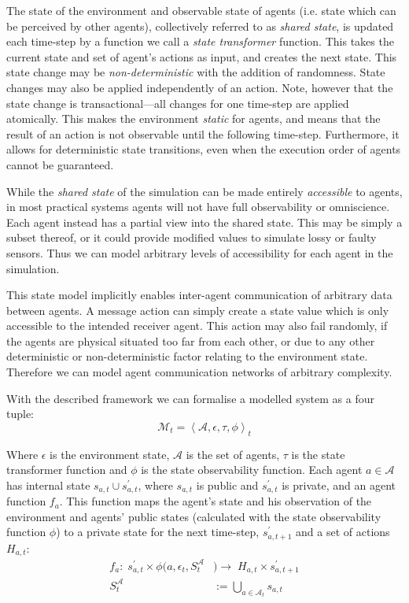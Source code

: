 The state of the environment and observable state of agents (i.e. state which
can be perceived by other agents), collectively referred to as \emph{shared
state}, is updated each time-step by a function we call a \emph{state
transformer} function. This takes the current state and set of agent's
actions as input, and creates the next state. This state change may be 
\emph{non-deterministic} with the addition of randomness. State changes may 
also be applied independently of an action. Note, however that the state change 
is transactional---all changes for one time-step are applied atomically. This
makes the environment \emph{static} for agents, and means that the result of
an action is not observable until the following time-step. Furthermore, it allows 
for deterministic state transitions, even when the execution order of agents 
cannot be guaranteed.

While the \emph{shared state} of the simulation can be made entirely
\emph{accessible} to agents, in most practical systems agents will not have
full observability or omniscience. Each agent instead has a partial view into
the shared state. This may be simply a subset thereof, or it could provide
modified values to simulate lossy or faulty sensors. Thus we can model
arbitrary levels of accessibility for each agent in the simulation.

This state model implicitly enables inter-agent communication of arbitrary
data between agents. A message action can simply create a state value which is
only accessible to the intended receiver agent. This action may also fail
randomly, if the agents are physical situated too far from each other, or due
to any other deterministic or non-deterministic factor relating to the environment
state. Therefore we can model agent communication networks of arbitrary
complexity.


With the described framework we can formalise a modelled system as a four tuple:
\begin{equation*}
\mathcal{M}_{t}=\left\langle \mathcal{A},\epsilon,\tau,\phi \right\rangle _{t}
\end{equation*}

Where $\epsilon$ is the environment state, $\mathcal{A}$ is the set of agents, $\tau$ is the state transformer function and $\phi$ is the state observability function. Each
agent $a\in\mathcal{A}$ has internal state $s_{a,t}\cup s_{a,t}^{\prime}$,
where $s_{a,t}$ is public and $s_{a,t}^{\prime}$ is private, and
an agent function $f_{a}$. This function maps the agent's state and his observation of the environment and agents' public states (calculated with the state observability function $\phi$) to a private
state for the next time-step, $s_{a,t+1}^{\prime}$ and a set of actions
$H{}_{a,t}$:
\begin{align*}
f_{a}:\; s_{a,t}^{\prime} \times \phi(a, \epsilon_{t}, S_{t}^{\mathcal{A}}&) \rightarrow\; H_{a,t}\times s_{a,t+1}^{\prime}\\
S_{t}^{\mathcal{A}}&:=\bigcup_{a\in\mathcal{A}_{t}}s_{a,t}
\end{align*}

